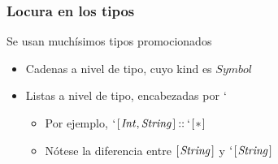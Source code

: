 \documentclass{beamer}
\newcommand{\Conid}[1]{\mathit{#1}}
\begin{document}
\begin{frame}[fragile]
\frametitle{Locura en los tipos}
Se usan muchísimos tipos promocionados
\begin{itemize}
\item Cadenas a nivel de tipo, cuyo kind es \ensuremath{\Conid{Symbol}}
\item Listas a nivel de tipo, encabezadas por \ensuremath{` \!}
\begin{itemize}
\item Por ejemplo, \ensuremath{` \!\;[\mskip1.5mu \Conid{Int},\Conid{String}\mskip1.5mu]\mathbin{::}` \!\;[\mskip1.5mu \mathbin{*}\mskip1.5mu]}
\item Nótese la diferencia entre \ensuremath{[\mskip1.5mu \Conid{String}\mskip1.5mu]} y \ensuremath{` \!\;[\mskip1.5mu \Conid{String}\mskip1.5mu]}
\end{itemize}
\end{itemize}
\end{frame}
\end{document}
